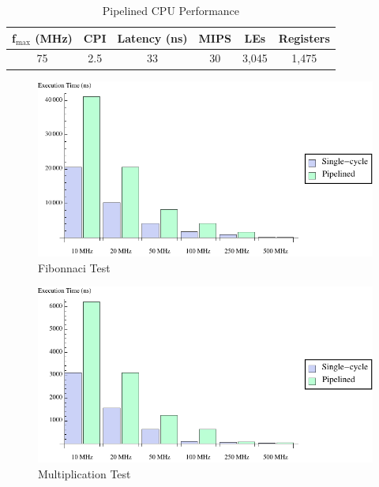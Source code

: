 \documentclass[12pt]{article}
\begin{document}
\begin{table}
\begin{center}

  \caption{Pipelined CPU Performance}
  \begin{tabular}{| c | c | c | c | c | c |}
  \hline
  f$_{\textrm{max}}$ (MHz) & CPI & Latency (ns) & MIPS & LEs & Registers \\ \hline
  75 & 2.5 & 33 & 30 & 3,045 & 1,475 \\ \hline
  \end{tabular}
  \label{tab:pipe}
  \end{center}

\end{table}


\begin{figure}
	\begin{center}
		\includegraphics{fib_chart}
	\end{center}
	\caption{Fibonnaci Test}
	\label{fig:fib_chart}
\end{figure}

\begin{figure}
	\begin{center}
		\includegraphics{mult_chart}
	\end{center}
	\caption{Multiplication Test}
	\label{fig:mult_chart}
\end{figure}
\end{document}
